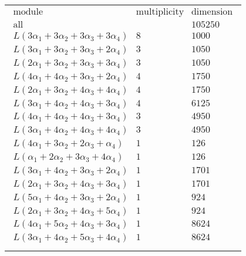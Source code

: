 \documentclass[crop,border=2mm]{standalone}
\begin{document}
\begin{tabular}{l}
$\displaystyle
\begin{array}{rll}
	\text{module}&\text{multiplicity}&\text{dimension} \\ \hline \text{all}&&105250 \\
	L\left( 3\alpha_{1}+ 3\alpha_{2}+ 3\alpha_{3}+ 3\alpha_{4}\right)&8&1000\\
	L\left( 3\alpha_{1}+ 3\alpha_{2}+ 3\alpha_{3}+ 2\alpha_{4}\right)&3&1050\\
	L\left( 2\alpha_{1}+ 3\alpha_{2}+ 3\alpha_{3}+ 3\alpha_{4}\right)&3&1050\\
	L\left( 4\alpha_{1}+ 4\alpha_{2}+ 3\alpha_{3}+ 2\alpha_{4}\right)&4&1750\\
	L\left( 2\alpha_{1}+ 3\alpha_{2}+ 4\alpha_{3}+ 4\alpha_{4}\right)&4&1750\\
	L\left( 3\alpha_{1}+ 4\alpha_{2}+ 4\alpha_{3}+ 3\alpha_{4}\right)&4&6125\\
	L\left( 4\alpha_{1}+ 4\alpha_{2}+ 4\alpha_{3}+ 3\alpha_{4}\right)&3&4950\\
	L\left( 3\alpha_{1}+ 4\alpha_{2}+ 4\alpha_{3}+ 4\alpha_{4}\right)&3&4950\\
	L\left( 4\alpha_{1}+ 3\alpha_{2}+ 2\alpha_{3}+\alpha_{4}\right)&1&126\\
	L\left(\alpha_{1}+ 2\alpha_{2}+ 3\alpha_{3}+ 4\alpha_{4}\right)&1&126\\
	L\left( 3\alpha_{1}+ 4\alpha_{2}+ 3\alpha_{3}+ 2\alpha_{4}\right)&1&1701\\
	L\left( 2\alpha_{1}+ 3\alpha_{2}+ 4\alpha_{3}+ 3\alpha_{4}\right)&1&1701\\
	L\left( 5\alpha_{1}+ 4\alpha_{2}+ 3\alpha_{3}+ 2\alpha_{4}\right)&1&924\\
	L\left( 2\alpha_{1}+ 3\alpha_{2}+ 4\alpha_{3}+ 5\alpha_{4}\right)&1&924\\
	L\left( 4\alpha_{1}+ 5\alpha_{2}+ 4\alpha_{3}+ 3\alpha_{4}\right)&1&8624\\
	L\left( 3\alpha_{1}+ 4\alpha_{2}+ 5\alpha_{3}+ 4\alpha_{4}\right)&1&8624
\end{array}
$ \\ \\

\end{tabular}
\end{document}
